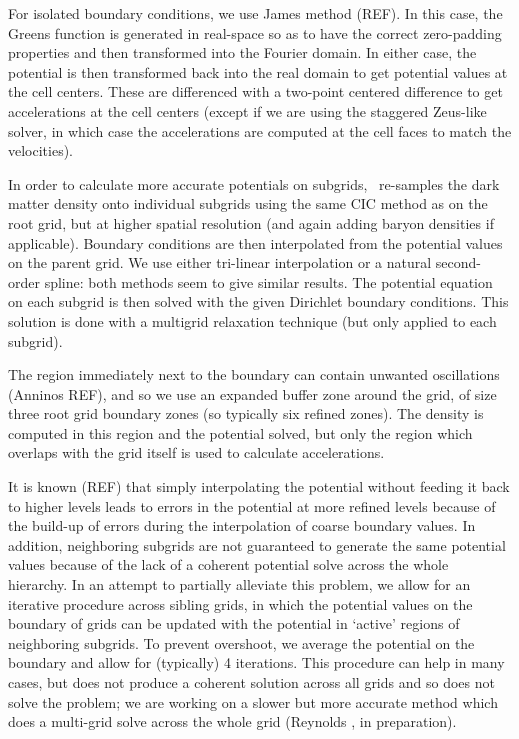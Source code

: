 For isolated boundary conditions, we use James method (REF).  In this case, the Greens function is generated in real-space so as to have the correct zero-padding properties and then transformed into the Fourier domain.  In either case, the potential is then transformed back into the real domain to get potential values at the cell centers.  These are differenced with a two-point centered difference to get accelerations at the cell centers (except if we are using the staggered Zeus-like solver, in which case the accelerations are computed at the cell faces to match the velocities).


In order to calculate more accurate potentials on subgrids, \enzo\ re-samples the dark matter density onto individual subgrids using the same CIC method as on the root grid, but at higher spatial resolution (and again adding baryon densities if applicable). Boundary conditions are then interpolated from the potential values on the parent grid.  We use either tri-linear interpolation or a natural second-order spline: both methods seem to give similar results. The potential equation on each subgrid is then solved with the given Dirichlet boundary conditions.  This solution is done with a multigrid relaxation technique (but only applied to each subgrid).

The region immediately next to the boundary can contain unwanted oscillations (Anninos \etal REF), and so we use an expanded buffer zone around the grid, of size three root grid boundary zones (so typically six refined zones).  The density is computed in this region and the potential solved, but only the region which overlaps with the grid itself is used to calculate accelerations.

It is known (REF) that simply interpolating the potential without feeding it back to higher levels leads to errors in the potential at more refined levels because of the build-up of errors during the interpolation of coarse boundary values.  
In addition, neighboring subgrids are not guaranteed to generate the same potential values because of the lack of a coherent potential solve across the whole hierarchy. In an attempt to partially alleviate this problem, we allow for an iterative procedure across sibling grids, in which the potential values on the boundary of grids can be updated with the potential in `active' regions of neighboring subgrids.  To prevent overshoot, we average the potential on the boundary and allow for (typically) 4 iterations.  This procedure can help in many cases, but does not produce a coherent solution across all grids and so does not solve the problem; we are working on a slower but more accurate method which does a multi-grid solve across the whole grid (Reynolds \etal, in preparation).


